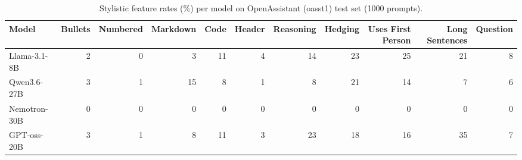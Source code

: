 \begin{table}[t]
\centering
\small
\begin{tabular}{lrrrrrrrrrr}
\toprule
Model & Bullets & Numbered & Markdown & Code & Header & Reasoning & Hedging & Uses First Person & Long Sentences & Question \\
\midrule
Llama-3.1-8B & 2 & 0 & 3 & 11 & 4 & 14 & 23 & 25 & 21 & 8 \\
Qwen3.6-27B & 3 & 1 & 15 & 8 & 1 & 8 & 21 & 14 & 7 & 6 \\
Nemotron-30B & 0 & 0 & 0 & 0 & 0 & 0 & 0 & 0 & 0 & 0 \\
GPT-oss-20B & 3 & 1 & 8 & 11 & 3 & 23 & 18 & 16 & 35 & 7 \\
\bottomrule
\end{tabular}
\caption{Stylistic feature rates (\%) per model on OpenAssistant (oasst1) test set (1000 prompts).}
\label{tab:oasst_style_rates}
\end{table}